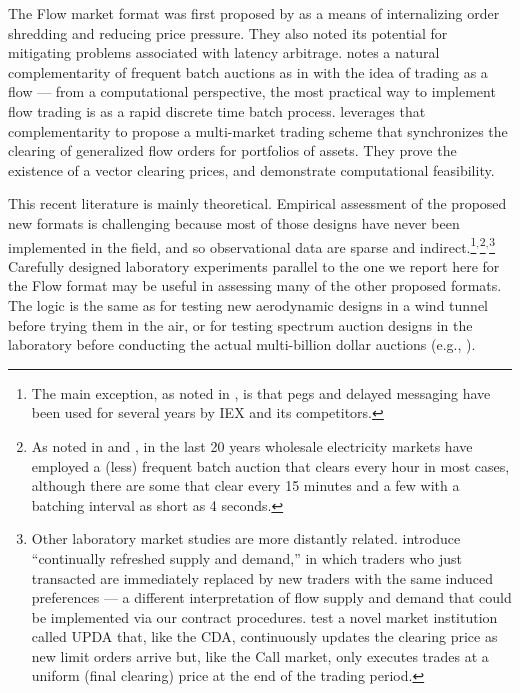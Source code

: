 \documentclass[12pt]{article}
\begin{document}
The Flow market format was first proposed by  \cite{Kyle2017} as a means of internalizing order shredding and reducing price pressure. They also noted its potential for mitigating problems associated with latency arbitrage.
\cite{Budish2023} notes a natural 
complementarity of frequent batch auctions as in 
\cite{Budish2015} with the idea of trading as a flow 
 --- from a computational perspective, the most practical way to implement flow trading is as a rapid discrete time batch process.   
\cite{Budish2023} leverages that complementarity to propose a multi-market trading scheme that synchronizes the clearing of generalized flow orders for portfolios of assets.  
They prove the existence of a vector clearing prices, and demonstrate computational feasibility.

This recent literature is mainly theoretical. 
Empirical assessment of the proposed new formats is challenging because most of those designs have never been implemented in the field, and so observational data are sparse and indirect.\footnote{
The main exception, as noted in \cite{Aldrich2022}, is that pegs and delayed messaging have been used for several years by IEX and its competitors.}$^,$\footnote{As noted in \cite{cramton2017electricity} and \cite{cramton2024forward}, 
in the last 20 years wholesale electricity markets have employed a (less) frequent batch auction that clears every hour in most cases, although there are some that clear every 15 minutes and a few with a batching interval as short as 4 
seconds.}$^,$\footnote{Other laboratory market studies are more distantly related. \cite{brewer2002behavioral} 
introduce ``continually refreshed supply and demand,'' in which traders who just transacted are immediately replaced by new traders with the same induced preferences --- a different interpretation of flow supply and demand that could be implemented via our contract procedures. 
\cite{mccabe1993designing} test a novel market institution called UPDA that, like the CDA, continuously updates the clearing price as new limit orders arrive but, like the Call market, only executes trades at a uniform (final clearing) price at the end of the trading period.}
Carefully designed laboratory experiments parallel to the one we report here for the Flow format may be useful in assessing many of the other proposed formats.
The logic is the same as for testing new aerodynamic designs in a wind tunnel before trying them in the air, or for testing spectrum auction designs in the laboratory before conducting the actual multi-billion dollar auctions (e.g., \cite{Binmore2002}).
\end{document}
